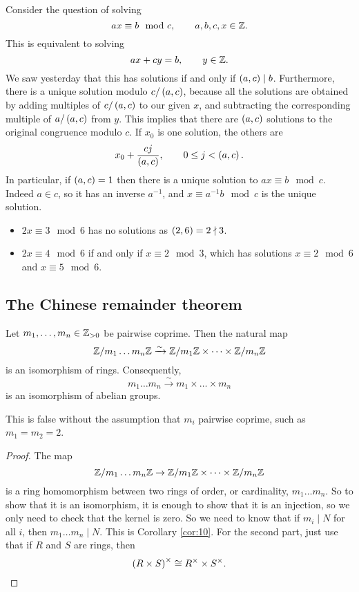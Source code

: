 Consider the question of solving
$$ ax \equiv b \mod c, \qquad a, b, c, x \in \mathbb{Z}. $$
This is equivalent to solving
$$ ax + cy = b, \qquad y \in \mathbb{Z}. $$
We saw yesterday that this has solutions if and only if $ \br{a, c} \mid b $. Furthermore, there is a unique solution modulo $ c / \br{a, c} $, because all the solutions are obtained by adding multiples of $ c / \br{a, c} $ to our given $ x $, and subtracting the corresponding multiple of $ a / \br{a, c} $ from $ y $. This implies that there are $ \br{a, c} $ solutions to the original congruence modulo $ c $. If $ x_0 $ is one solution, the others are
$$ x_0 + \dfrac{cj}{\br{a, c}}, \qquad 0 \le j < \br{a, c}. $$
In particular, if $ \br{a, c} = 1 $ then there is a unique solution to $ ax \equiv b \mod c $. Indeed $ a \in \unit{c} $, so it has an inverse $ a^{-1} $, and $ x \equiv a^{-1}b \mod c $ is the unique solution.

\pagebreak

\begin{example*}
\hfill
\begin{itemize}
\item $ 2x \equiv 3 \mod 6 $ has no solutions as $ \br{2, 6} = 2 \nmid 3 $.
\item $ 2x \equiv 4 \mod 6 $ if and only if $ x \equiv 2 \mod 3 $, which has solutions $ x \equiv 2 \mod 6 $ and $ x \equiv 5 \mod 6 $.
\end{itemize}
\end{example*}

\subsection{The Chinese remainder theorem}

\begin{theorem}
\label{thm:14}
Let $ m_1, \dots, m_n \in \mathbb{Z}_{> 0} $ be pairwise coprime. Then the natural map
$$ \mathbb{Z} / m_1 \dots m_n\mathbb{Z} \xrightarrow{\sim} \mathbb{Z} / m_1\mathbb{Z} \times \dots \times \mathbb{Z} / m_n\mathbb{Z} $$
is an isomorphism of rings. Consequently,
$$ \unit{m_1 \dots m_n} \xrightarrow{\sim} \unit{m_1} \times \dots \times \unit{m_n} $$
is an isomorphism of abelian groups.
\end{theorem}

\begin{remark*}
This is false without the assumption that $ m_i $ pairwise coprime, such as $ m_1 = m_2 = 2 $.
\end{remark*}

\begin{proof}
The map
$$ \mathbb{Z} / m_1 \dots m_n\mathbb{Z} \to \mathbb{Z} / m_1\mathbb{Z} \times \dots \times \mathbb{Z} / m_n\mathbb{Z} $$
is a ring homomorphism between two rings of order, or cardinality, $ m_1 \dots m_n $. So to show that it is an isomorphism, it is enough to show that it is an injection, so we only need to check that the kernel is zero. So we need to know that if $ m_i \mid N $ for all $ i $, then $ m_1 \dots m_n \mid N $. This is Corollary \ref{cor:10}. For the second part, just use that if $ R $ and $ S $ are rings, then
$$ \br{R \times S}^\times \cong R^\times \times S^\times. $$
\end{proof}


